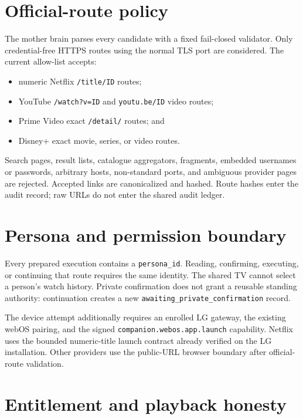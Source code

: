 \documentclass[11pt,a4paper]{article}
\begin{document}
\section{Official-route policy}

The mother brain parses every candidate with a fixed fail-closed validator.
Only credential-free HTTPS routes using the normal TLS port are considered.
The current allow-list accepts:

\begin{itemize}
  \item numeric Netflix \texttt{/title/ID} routes;
  \item YouTube \texttt{/watch?v=ID} and \texttt{youtu.be/ID} video routes;
  \item Prime Video exact \texttt{/detail/} routes; and
  \item Disney+ exact movie, series, or video routes.
\end{itemize}

Search pages, result lists, catalogue aggregators, fragments, embedded usernames
or passwords, arbitrary hosts, non-standard ports, and ambiguous provider pages
are rejected.  Accepted links are canonicalized and hashed.  Route hashes enter
the audit record; raw URLs do not enter the shared audit ledger.

\section{Persona and permission boundary}

Every prepared execution contains a \texttt{persona\_id}.  Reading,
confirming, executing, or continuing that route requires the same identity.
The shared TV cannot select a person's watch history.  Private confirmation does
not grant a reusable standing authority: continuation creates a new
\texttt{awaiting\_private\_confirmation} record.

The device attempt additionally requires an enrolled LG gateway, the existing
webOS pairing, and the signed
\texttt{companion.webos.app.launch} capability.  Netflix uses the bounded
numeric-title launch contract already verified on the LG installation.  Other
providers use the public-URL browser boundary after official-route validation.

\section{Entitlement and playback honesty}
\end{document}
